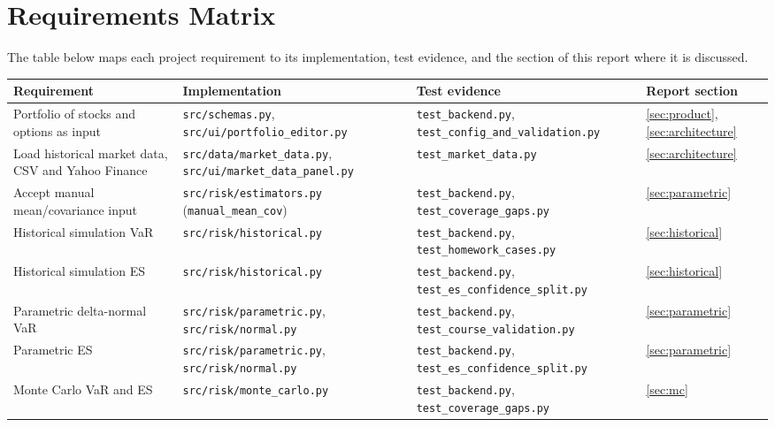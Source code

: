 \documentclass[11pt]{article}
\newcommand{\code}[1]{\texttt{#1}}
\begin{document}
\section{Requirements Matrix}
\label{sec:req-matrix}

The table below maps each project requirement to its implementation,
test evidence, and the section of this report where it is discussed.

\begin{center}
\scriptsize
\begin{longtable}{L{3.0cm}L{4.5cm}L{4.2cm}L{2.0cm}}
\toprule
\textbf{Requirement} & \textbf{Implementation} & \textbf{Test evidence} & \textbf{Report section} \\
\midrule
Portfolio of stocks and options as input
  & \code{src/schemas.py}, \code{src/ui/portfolio\_editor.py}
  & \code{test\_backend.py}, \code{test\_config\_and\_validation.py}
  & \ref{sec:product}, \ref{sec:architecture} \\[4pt]
Load historical market data, CSV and Yahoo Finance
  & \code{src/data/market\_data.py}, \code{src/ui/market\_data\_panel.py}
  & \code{test\_market\_data.py}
  & \ref{sec:architecture} \\[4pt]
Accept manual mean/covariance input
  & \code{src/risk/estimators.py} (\code{manual\_mean\_cov})
  & \code{test\_backend.py}, \code{test\_coverage\_gaps.py}
  & \ref{sec:parametric} \\[4pt]
Historical simulation VaR
  & \code{src/risk/historical.py}
  & \code{test\_backend.py}, \code{test\_homework\_cases.py}
  & \ref{sec:historical} \\[4pt]
Historical simulation ES
  & \code{src/risk/historical.py}
  & \code{test\_backend.py}, \code{test\_es\_confidence\_split.py}
  & \ref{sec:historical} \\[4pt]
Parametric delta-normal VaR
  & \code{src/risk/parametric.py}, \code{src/risk/normal.py}
  & \code{test\_backend.py}, \code{test\_course\_validation.py}
  & \ref{sec:parametric} \\[4pt]
Parametric ES
  & \code{src/risk/parametric.py}, \code{src/risk/normal.py}
  & \code{test\_backend.py}, \code{test\_es\_confidence\_split.py}
  & \ref{sec:parametric} \\[4pt]
Monte Carlo VaR and ES
  & \code{src/risk/monte\_carlo.py}
  & \code{test\_backend.py}, \code{test\_coverage\_gaps.py}
  & \ref{sec:mc} \\[4pt]

\end{longtable}
\end{center}
\end{document}
